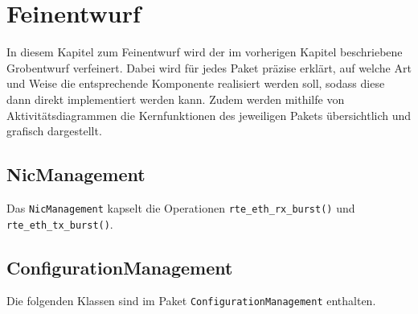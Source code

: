 \documentclass[../review_2.tex]{subfiles}
\begin{document}
\chapter{Feinentwurf}\thispagestyle{fancy}
In diesem Kapitel zum Feinentwurf wird der im vorherigen Kapitel beschriebene Grobentwurf verfeinert. Dabei wird für jedes Paket präzise erklärt, auf welche Art und Weise die entsprechende Komponente realisiert werden soll, sodass diese dann direkt implementiert werden kann. Zudem werden mithilfe von Aktivitätsdiagrammen die Kernfunktionen des jeweiligen Pakets übersichtlich und grafisch dargestellt.

\section{NicManagement}
Das \texttt{NicManagement} kapselt die Operationen \texttt{rte\_eth\_rx\_burst()} und \texttt{rte\_eth\_tx\_burst()}.

\section{ConfigurationManagement}

Die folgenden Klassen sind im Paket \texttt{ConfigurationManagement} enthalten.
\end{document}
